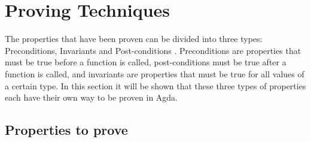 \section{Proving Techniques}

The properties that have been proven can be divided into three types: Preconditions, Invariants and Post-conditions \cite{meyer_1992}. Preconditions are properties that must be true before a function is called, post-conditions must be true after a function is called, and invariants are properties that must be true for all values of a certain type. In this section it will be shown that these three types of properties each have their own way to be proven in Agda.
\subsection{Properties to prove}\label{props_to_prove}

